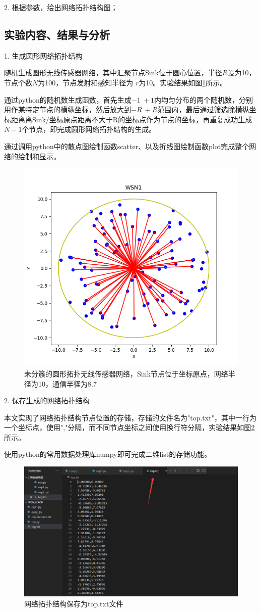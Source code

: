 \documentclass[UTF8]{article} %
\begin{document}
	2. 根据参数，绘出网络拓扑结构图；
	
	\subsection{实验内容、结果与分析}
	1. 生成圆形网络拓扑结构
	
	 随机生成圆形无线传感器网络，其中汇聚节点Sink位于圆心位置，半径$R$设为10，节点个数$N$为100，节点发射和感知半径为 $r$为10。实验结果如图\ref{fig:figure1}所示。
	 
	 通过python的随机数生成函数，首先生成$-1~+1$内均匀分布的两个随机数，分别用作某特定节点的横纵坐标，然后放大到$-R~+R$范围内，最后通过筛选除横纵坐标距离离Sink/坐标原点距离不大于R的坐标点作为节点的坐标，再重复成功生成$N-1$个节点，即完成圆形网络拓扑结构的生成。
	 
	 通过调用python中的散点图绘制函数scatter、以及折线图绘制函数plot完成整个网络的绘制和显示。
	
	\begin{figure}[H]
		\centering
		\includegraphics[width=0.7\linewidth]{Figure_1}
		\caption{未分簇的圆形拓扑无线传感器网络，Sink节点位于坐标原点，网络半径为10，通信半径为8.7}
		\label{fig:figure1}
	\end{figure}

	2. 保存生成的网络拓扑结构
	
	本文实现了网络拓扑结构节点位置的存储，存储的文件名为"top.txt"，其中一行为一个坐标点，使用","分隔，而不同节点坐标之间使用换行符分隔，实验结果如图\ref{fig:screenshot004}所示。
	
	使用python的常用数据处理库numpy即可完成二维list的存储功能。
	
	\begin{figure}[H]
		\centering
		\includegraphics[width=0.7\linewidth]{screenshot004}
		\caption{网络拓扑结构保存为top.txt文件}
		\label{fig:screenshot004}
	\end{figure}
\end{document}
